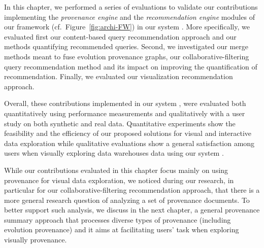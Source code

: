 



In this chapter, we performed a series of evaluations to validate our contributions implementing the \emph{provenance engine} and the \emph{recommendation engine} modules of our framework \framework{} (cf.~Figure~\ref{fig:archi-FW}) in our system \prototype{}.
More specifically, we evaluated first our content-based query recommendation approach and our methods quantifying recommended queries.  Second, we investigated our merge methods meant to fuse evolution provenance graphs, our collaborative-filtering query recommendation method and its impact on improving the quantification of recommendation.
Finally, we evaluated our visualization recommendation approach.

Overall, these contributions implemented in our system \prototype{}, were evaluated  both quantitatively using performance measurements and qualitatively with a user study on both synthetic and real data. 
Quantitative experiments show the feasibility and the efficiency of our proposed solutions for visual and interactive data exploration while qualitative evaluations show a general satisfaction among users when visually exploring data warehouses data using our system \prototype{}. 



While our contributions evaluated in this chapter focus mainly on using provenance for visual data exploration, we noticed during our research, in particular for our collaborative-filtering recommendation approach, that there is a more general research question of analyzing a set of provenance documents. To better support such analysis, we discuss in the next chapter, a general provenance summary approach that processes diverse types of provenance (including evolution provenance) and it aims at facilitating users' task when exploring visually provenance.




